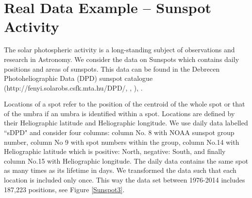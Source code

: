 \documentclass[preprint,11pt,a4paper]{elsarticle}
\begin{document}
\section{Real Data Example -- Sunspot Activity}

The solar photospheric activity is a long-standing subject of observations
and research in Astronomy. We consider the data on Sunspots which contains
daily positions and areas of sunspots. This data can be found in the
Debrecen Photoheliographic Data (DPD) sunspot catalogue \newline
(http://fenyi.solarobs.csfk.mta.hu/DPD/, \cite{baranyi2016line}, \cite%
{gyHori2016comparative}), \cite{gyenge2014variations} .

Locations of a spot refer to the position of the centroid of the whole spot
or that of the umbra if an umbra is identified within a spot. Locations are
defined by their Heliographic latitude and Heliographic longitude. We use
daily data labelled \textquotedblleft sDPD" and consider four columns:
column No. 8 with NOAA sunspot group number, column No 9 with spot numbers
within the group, column No.14 with Heliographic latitude which is positive:
North, negative: South, and finally column No.15 with Heliographic
longitude. The daily data contains the same spot as many times as its
lifetime in days. We transformed the data such that each location is
included only once. This way the data set between 1976-2014 includes 187,223
positions, see Figure \ref{Sunspot3}.

\end{document}
